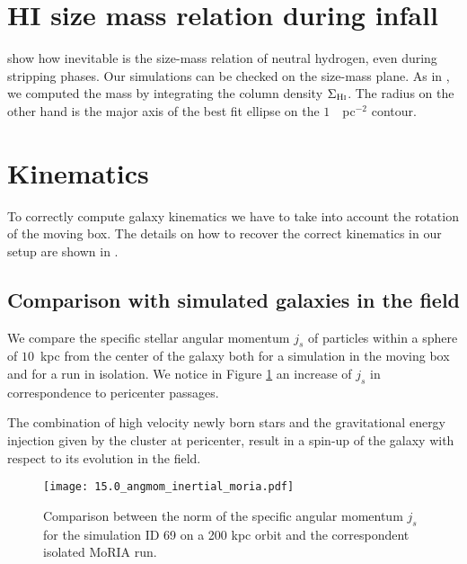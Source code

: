 \section{HI size mass relation during infall}
\citet{Stevens2019} show how inevitable is the size-mass relation of neutral hydrogen, even during stripping phases.
Our simulations can be checked on the size-mass plane.
As in \citet{Verbeke2017}, we computed the \Hi{} mass by integrating the \Hi{} column density $\Sigma_{\text{H\textsc{i}}}$. The radius on the other hand is the major axis of the best fit ellipse on the $1$~\Msun{}~pc$^{-2}$ contour.

\section{Kinematics}
To correctly compute galaxy kinematics we have to take into account the rotation of the moving box.
The details on how to recover the correct kinematics in our setup are shown in .

\subsection{Comparison with simulated galaxies in the field}
We compare the specific stellar angular momentum $j_s$ of particles within a sphere of $10$~kpc from the center of the galaxy both for a simulation in the moving box and for a run in isolation.
We notice in Figure \ref{fig:j_s_moria} an increase of $j_s$ in correspondence to pericenter passages.

The combination of high velocity newly born stars and the gravitational energy injection given by the cluster at pericenter, result in a spin-up of the galaxy with respect to its evolution in the field.

\begin{figure}
\centering
\texttt{[image: 15.0\_angmom\_inertial\_moria.pdf]}
\caption{Comparison between the norm of the specific angular momentum $j_s$ for the simulation ID 69 on a 200 kpc orbit and the correspondent isolated MoRIA run.}
\label{fig:j_s_moria}
\end{figure}

